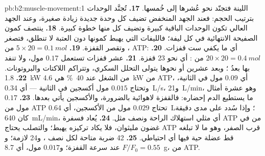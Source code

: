 \begin{solution}{pb:b2:muscle-movement:1}
اللينة فتجنّد نحو عُشرها إلى خُمسها.
\textbf{17.} تُجنَّد الوحدات بترتيب الحجم: فعند الجهد المنخفض تضيف كل
وحدة جديدة زيادة صغيرة، وعند الجهد العالي تكون الوحدات الباقية
كبيرة وتضيف كل منها خطوة كبيرة.
\textbf{18.} ينتصف كمون الصفيحة الانتهائية في كل ليفة؛ فالليفات
التي يهبط كمونها دون العتبة لا تنطلق، فتصغر
 ، وتقصر القفزة.
\textbf{19.} $5\times 20 = \qty{0.1}{mol}$ من ATP: أي ما يكفي ست قفزات.
\textbf{20.} $20\times 20 = \qty{0.4}{mol}$ من :
أي نحو 23 قفزة.
\textbf{21.} عشر قفزات تستعمل $0.17$ مول، ولا تنفد بها بعدُ ؛ وبعد عشرين أو نحوها يتولى التحلل السكري، وتتراكم اللاكتات
والبروتونات.
\textbf{22.} \qty{1.8}{kW} من الشغل عند \qty{40}{\%} هي \qty{4.6}{kW} من
ATP، أي $0.09$ مول في الثانية، وتحتاج $0.015$ مول أكسجين في الثانية ---
أي \qty{0.34}{L/s}، و\qty{21}{L/min}، وهو عشرة أمثال ما يستطيع الدم إحضاره:
فالقفزة لاهوائية بالضرورة، والأكسجين يأتي بعدها.
\textbf{23.} $0.17$ مول من ATP تحتاج $0.029$ مول من الأكسجين،
أي \qty{0.64}{L}؛ وإذا سُدد على مدى دقيقة كان \qty{640}{mL/min}، أي مثلي
استهلاك الراحة ونصف مثل.
\textbf{24.} يُعاد فسفرة ATP من  في غضون
مليثوان، فلا يكاد تركيزه يهبط؛ والتصلب يحتاج ATP
قرب الصفر، وهو ما لا تبلغه قط عضلة حية فيها أي احتياطي.
\textbf{25.} 42 ضربة متاحة لكل نصف ، و24 لازمة؛
و$F/F_0 = 0.55$ عند سرعة القفزة؛ و$0.017$ مول، أي \qty{8.7}{g}، من ATP.
\end{solution}
